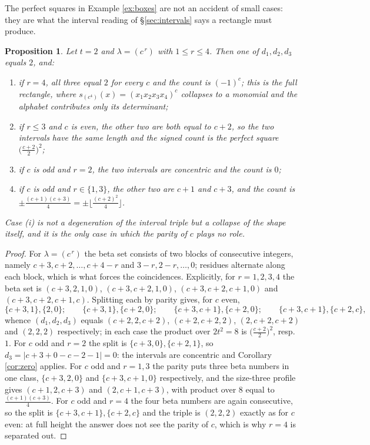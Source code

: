 \documentclass[11pt,reqno]{amsart}
\theoremstyle{plain}
\newtheorem{proposition}[theorem]{Proposition}
\theoremstyle{definition}
\begin{document}
The perfect squares in Example \ref{ex:boxes} are not an accident of small cases: they are what the
interval reading of \S\ref{sec:intervals} says a rectangle must produce.

\begin{proposition}\label{prop:rect}
Let $t=2$ and $\lambda=(c^{\,r})$ with $1\le r\le4$. Then one of $d_1,d_2,d_3$ equals $2$, and:
\begin{enumerate}
\item[\rm(i)] if $r=4$, all three equal $2$ for \emph{every} $c$ and the count is $(-1)^c$; this is
the full rectangle, where $s_{(c^4)}(x)=(x_1x_2x_3x_4)^{c}$ collapses to a monomial and the alphabet
contributes only its determinant;
\item[\rm(ii)] if $r\le3$ and $c$ is even, the other two are both equal to $c+2$, so the two
intervals have the \emph{same length} and the signed count is the perfect square
$\bigl(\tfrac{c+2}{2}\bigr)^2$;
\item[\rm(iii)] if $c$ is odd and $r=2$, the two intervals are \emph{concentric} and the count is $0$;
\item[\rm(iv)] if $c$ is odd and $r\in\{1,3\}$, the other two are $c+1$ and $c+3$, and the count is
$\pm\tfrac{(c+1)(c+3)}{4}=\pm\bigl\lfloor\tfrac{(c+2)^2}{4}\bigr\rfloor$.
\end{enumerate}
Case {\rm(i)} is not a degeneration of the interval triple but a collapse of the shape itself, and it
is the only case in which the parity of $c$ plays no role.
\end{proposition}

\begin{proof}
For $\lambda=(c^{\,r})$ the beta set consists of two blocks of consecutive integers, namely
$c+3,c+2,\dots,c+4-r$ and $3-r,2-r,\dots,0$; residues alternate along each block, which is what
forces the coincidences. Explicitly, for $r=1,2,3,4$ the beta set is $(c+3,2,1,0)$, $(c+3,c+2,1,0)$,
$(c+3,c+2,c+1,0)$ and $(c+3,c+2,c+1,c)$. Splitting each by parity gives, for $c$ even,
\[
\{c{+}3,1\},\{2,0\};\qquad \{c{+}3,1\},\{c{+}2,0\};\qquad \{c{+}3,c{+}1\},\{c{+}2,0\};\qquad
\{c{+}3,c{+}1\},\{c{+}2,c\},
\]
whence $(d_1,d_2,d_3)$ equals $(c{+}2,2,c{+}2)$, $(c{+}2,c{+}2,2)$, $(2,c{+}2,c{+}2)$ and
$(2,2,2)$ respectively; in each case the product over $2t^2=8$ is $\bigl(\tfrac{c+2}{2}\bigr)^2$,
resp. $1$. For $c$ odd and $r=2$ the split is $\{c{+}3,0\},\{c{+}2,1\}$, so
$d_3=|c{+}3+0-c{-}2-1|=0$: the intervals are concentric and Corollary \ref{cor:zero} applies. For
$c$ odd and $r=1,3$ the parity puts three beta numbers in one class, $\{c{+}3,2,0\}$ and
$\{c{+}3,c{+}1,0\}$ respectively, and the size-three profile gives $(c{+}1,2,c{+}3)$ and
$(2,c{+}1,c{+}3)$, with product over $8$ equal to $\tfrac{(c+1)(c+3)}{4}$. For $c$ odd and $r=4$ the
four beta numbers are again consecutive, so the split is $\{c{+}3,c{+}1\},\{c{+}2,c\}$ and the triple
is $(2,2,2)$ exactly as for $c$ even: at full height the answer does not see the parity of $c$, which
is why $r=4$ is separated out.
\end{proof}
\end{document}
